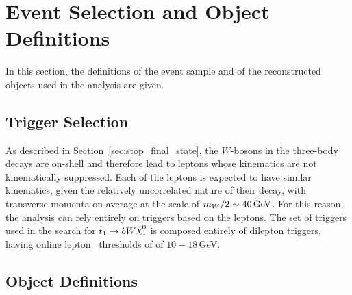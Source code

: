 \section{Event Selection and Object Definitions}
\label{sec:stop_event_sel}

In this section, the definitions of the event sample and of the reconstructed
objects used in the analysis are given.

%
%

\subsection{Trigger Selection}
\label{sec:stop_trigger}

As described in Section~\ref{sec:stop_final_state}, the $W$-bosons in the three-body
\stopone decays are on-shell and therefore lead to leptons whose kinematics are not
kinematically suppressed.
Each of the leptons is expected to have similar kinematics, given the relatively uncorrelated nature
of their decay, with transverse momenta on average at the scale of $m_W / 2 \sim 40\,\text{Ge\kern -0.1em V}$.
For this reason, the analysis can rely entirely on triggers based on the leptons.
The set of triggers used in the search for $\bWN$ is composed entirely of dilepton triggers,
having online lepton \pT~thresholds of of $10-18$\,GeV.

%
%

\subsection{Object Definitions}
\label{sec:stop_object_def}

